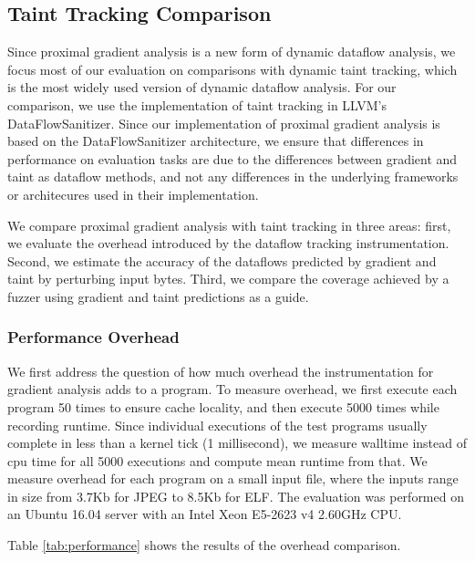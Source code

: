 \subsection{Taint Tracking Comparison}

Since proximal gradient analysis is a new form of dynamic dataflow analysis, we focus most of our evaluation on comparisons with dynamic taint tracking, which is the most widely used version of dynamic dataflow analysis. For our comparison, we use the implementation of taint tracking in LLVM's DataFlowSanitizer. Since our implementation of proximal gradient analysis is based on the DataFlowSanitizer architecture, we ensure that differences in performance on evaluation tasks are due to the differences between gradient and taint as dataflow methods, and not any differences in the underlying frameworks or architecures used in their implementation. 

We compare proximal gradient analysis with taint tracking in three areas: first, we evaluate the overhead introduced by the dataflow tracking instrumentation. Second, we estimate the accuracy of the dataflows predicted by gradient and taint by perturbing input bytes. Third, we compare the coverage achieved by a fuzzer using gradient and taint predictions as a guide. 


\subsubsection{Performance Overhead}

We first address the question of how much overhead the instrumentation for gradient analysis adds to a program. To measure overhead, we first execute each program 50 times to ensure cache locality, and then execute 5000 times while recording runtime. Since individual executions of the test programs usually complete in less than a kernel tick (1 millisecond), we measure walltime instead of cpu time for all 5000 executions and compute mean runtime from that. We measure overhead for each program on a small input file, where the inputs range in size from 3.7Kb for JPEG to 8.5Kb for ELF.  The evaluation was performed on an Ubuntu 16.04 server with an Intel Xeon E5-2623 v4 2.60GHz CPU.

Table \ref{tab:performance} shows the results of the overhead comparison. 



